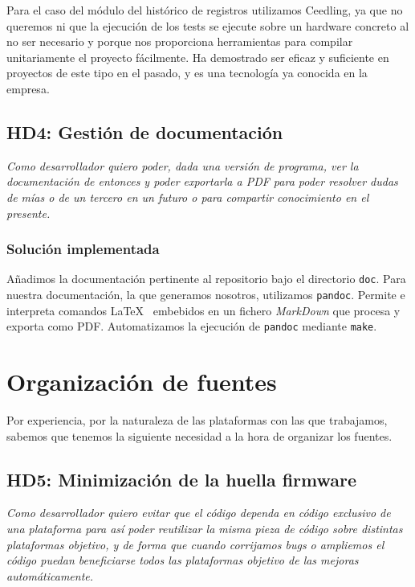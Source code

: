 Para el caso del módulo del histórico de registros utilizamos
Ceedling, ya que no queremos ni que la ejecución de los tests
se ejecute sobre un hardware concreto al no ser necesario y
porque nos proporciona herramientas para compilar unitariamente
el proyecto fácilmente. Ha demostrado ser eficaz y suficiente
en proyectos de este tipo en el pasado, y es una tecnología ya
conocida en la empresa.

\subsection{HD4: Gestión de documentación}

\textit{Como desarrollador quiero poder, dada una versión de programa,
ver la documentación de entonces y poder exportarla a PDF para
poder resolver dudas de mías o de un tercero en un futuro o
para compartir conocimiento en el presente.}

\subsubsection{Solución implementada}

Añadimos la documentación pertinente al repositorio bajo el directorio
\texttt{doc}. Para nuestra documentación, la que generamos nosotros,
utilizamos \texttt{pandoc}. Permite e interpreta comandos \LaTeX
\ embebidos en un fichero \textit{MarkDown} que procesa y exporta como PDF.
Automatizamos la ejecución de \texttt{pandoc} mediante \texttt{make}.

\section{Organización de fuentes}

Por experiencia, por la naturaleza de las plataformas con las que
trabajamos, sabemos que tenemos la siguiente necesidad a la hora
de organizar los fuentes.

\subsection{HD5: Minimización de la huella firmware}

\textit{Como desarrollador quiero evitar que el código dependa en
código exclusivo de una plataforma para así poder reutilizar
la misma pieza de código sobre distintas plataformas objetivo, y de forma
que cuando corrijamos bugs o ampliemos el código puedan beneficiarse
todos las plataformas objetivo de las mejoras automáticamente.}

